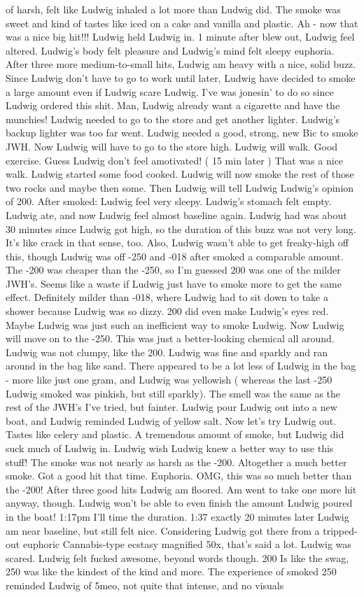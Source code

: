 \documentclass[12pt]{book}
\begin{document}
of harsh, felt like Ludwig inhaled a lot more than Ludwig did. The smoke was sweet and kind of tastes like iced on a cake and vanilla and plastic. Ah - now that was a nice big hit!!! Ludwig held Ludwig in. 1 minute after blew out, Ludwig feel altered. Ludwig's body felt pleasure and Ludwig's mind felt sleepy euphoria. After three more medium-to-small hits, Ludwig am heavy with a nice, solid buzz. Since Ludwig don't have to go to work until later, Ludwig have decided to smoke a large amount even if Ludwig scare Ludwig. I've was jonesin' to do so since Ludwig ordered this shit. Man, Ludwig already want a cigarette and have the munchies! Ludwig needed to go to the store and get another lighter. Ludwig's backup lighter was too far went. Ludwig needed a good, strong, new Bic to smoke JWH. Now Ludwig will have to go to the store high. Ludwig will walk. Good exercise. Guess Ludwig don't feel amotivated! ( 15 min later ) That was a nice walk. Ludwig started some food cooked. Ludwig will now smoke the rest of those two rocks and maybe then some. Then Ludwig will tell Ludwig Ludwig's opinion of 200. After smoked: Ludwig feel very sleepy. Ludwig's stomach felt empty. Ludwig ate, and now Ludwig feel almost baseline again. Ludwig had was about 30 minutes since Ludwig got high, so the duration of this buzz was not very long. It's like crack in that sense, too. Also, Ludwig wasn't able to get freaky-high off this, though Ludwig was off -250 and -018 after smoked a comparable amount. The -200 was cheaper than the -250, so I'm guessed 200 was one of the milder JWH's. Seems like a waste if Ludwig just have to smoke more to get the same effect. Definitely milder than -018, where Ludwig had to sit down to take a shower because Ludwig was so dizzy. 200 did even make Ludwig's eyes red. Maybe Ludwig was just such an inefficient way to smoke Ludwig. Now Ludwig will move on to the -250. This was just a better-looking chemical all around. Ludwig was not clumpy, like the 200. Ludwig was fine and sparkly and ran around in the bag like sand. There appeared to be a lot less of Ludwig in the bag - more like just one gram, and Ludwig was yellowish ( whereas the last -250 Ludwig smoked was pinkish, but still sparkly). The smell was the same as the rest of the JWH's I've tried, but fainter. Ludwig pour Ludwig out into a new boat, and Ludwig reminded Ludwig of yellow salt. Now let's try Ludwig out. Tastes like celery and plastic. A tremendous amount of smoke, but Ludwig did suck much of Ludwig in. Ludwig wish Ludwig knew a better way to use this stuff! The smoke was not nearly as harsh as the -200. Altogether a much better smoke. Got a good hit that time. Euphoria. OMG, this was so much better than the -200! After three good hits Ludwig am floored. Am went to take one more hit anyway, though. Ludwig won't be able to even finish the amount Ludwig poured in the boat! 1:17pm I'll time the duration. 1:37 exactly 20 minutes later Ludwig am near baseline, but still felt nice. Considering Ludwig got there from a tripped-out euphoric Cannabis-type ecstasy magnified 50x, that's said a lot. Ludwig was scared. Ludwig felt fucked awesome, beyond words though. 200 Is like the swag, 250 was like the kindest of the kind and more. The experience of smoked 250 reminded Ludwig of 5meo, not quite that intense, and no visuals 
\end{document}
